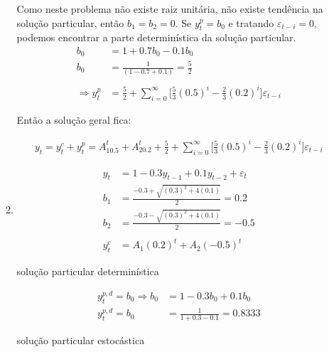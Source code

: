 \begin{enumerate}
\begin{enumerate}
	Como neste problema não existe raiz unitária, não existe tendência na solução particular, então $b_1=b_2=0$. Se $y_t^p=b_0$ e tratando $\varepsilon_{t-i}=0$, podemos encontrar a parte determinística da solução particular.
	\begin{align*}
		b_0&=1+0.7b_0-0.1b_0\\
		b_0&=\frac{1}{(1-0.7+0.1)}=\frac{5}{2}\\
		\\
		\Rightarrow y_t^p&=\frac{5}{2}+\sum\limits_{i=0}^{\infty}\Bigg[\frac{5}{3}(0.5)^i-\frac{2}{3}(0.2)^i\Bigg]\varepsilon_{t-i}
	\end{align*}
	
	Então a solução geral fica:
	
	\begin{align*}
	y_t=y_t^c+y_t^p=A_10.5^t+A_20.2^t+\frac{5}{2}+\sum\limits_{i=0}^{\infty}\Bigg[\frac{5}{3}(0.5)^i-\frac{2}{3}(0.2)^i\Bigg]\varepsilon_{t-i}
	\end{align*}

	
		
		
	\item %
	\begin{align*}
			y_t &= 1 -0.3y_{t-1} + 0.1y_{t-2} + \varepsilon_t\\
			b_1&=\frac{-0.3+\sqrt{(0.3)^2+4(0.1)}}{2}=0.2\\
			b_2&=\frac{-0.3-\sqrt{(0.3)^2+4(0.1)}}{2}=-0.5\\
			\\
			y_t^c&=A_1(0.2)^t+A_2(-0.5)^t
	\end{align*}
	
	solução particular determinística
	
	\begin{align*}
	 y_t^{p,d}=b_0 \Rightarrow b_0&=1-0.3b_0+0.1b_0\\
	 y_t^{p,d}=b_0&=\frac{1}{1+0.3-0.1}=0.8333
	\end{align*}
	
	solução particular estocástica
	

\end{enumerate}
\end{enumerate}
